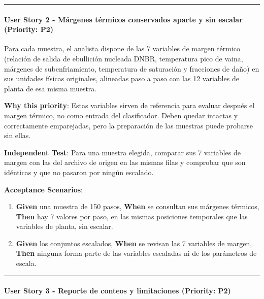 \documentclass[12pt,a4paper]{article}
\providecommand{\tightlist}{\setlength{\itemsep}{0pt}\setlength{\parskip}{0pt}}
\newenvironment{documentogenerado}[2]{%
  \def\doccomando{#1}\def\docruta{#2}%
  \par\begingroup\small\setstretch{1.15}\sloppy%
}{\endgroup\par\medskip}
\begin{document}
\begin{documentogenerado}{/speckit-specify + /speckit-clarify}{specs\slash 001-preparacion-datos\slash spec.md}
\begin{center}\rule{0.5\linewidth}{0.5pt}\end{center}

\paragraph{User Story 2 - Márgenes térmicos conservados aparte y sin escalar (Priority: P2)}

Para cada muestra, el analista dispone de las 7 variables de margen térmico (relación de salida de ebullición nucleada DNBR, temperatura pico de vaina, márgenes de subenfriamiento, temperatura de saturación y fracciones de daño) en sus unidades físicas originales, alineadas paso a paso con las 12 variables de planta de esa misma muestra.

\textbf{Why this priority}: Estas variables sirven de referencia para evaluar después el margen térmico, no como entrada del clasificador. Deben quedar intactas y correctamente emparejadas, pero la preparación de las muestras puede probarse sin ellas.

\textbf{Independent Test}: Para una muestra elegida, comparar sus 7 variables de margen con las del archivo de origen en las mismas filas y comprobar que son idénticas y que no pasaron por ningún escalado.

\textbf{Acceptance Scenarios}:

\begin{enumerate}
\def\labelenumi{\arabic{enumi}.}
\tightlist
\item
  \textbf{Given} una muestra de 150 pasos, \textbf{When} se consultan sus márgenes térmicos, \textbf{Then} hay 7 valores por paso, en las mismas posiciones temporales que las variables de planta, sin escalar.
\item
  \textbf{Given} los conjuntos escalados, \textbf{When} se revisan las 7 variables de margen, \textbf{Then} ninguna forma parte de las variables escaladas ni de los parámetros de escala.
\end{enumerate}

\begin{center}\rule{0.5\linewidth}{0.5pt}\end{center}

\paragraph{User Story 3 - Reporte de conteos y limitaciones (Priority: P2)}


\end{documentogenerado}
\end{document}
